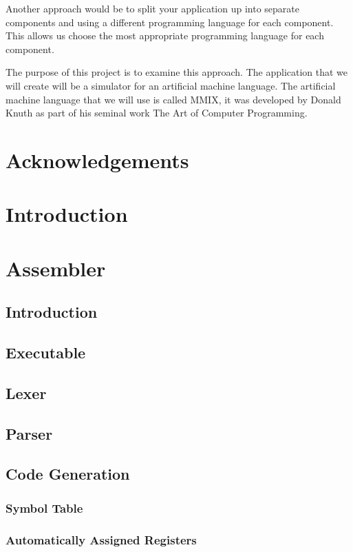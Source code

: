 \documentclass[a4paper,11pt]{report}
\begin{document}
Another approach would be to split your application up into separate components and using a different programming language for each component. This allows us choose the most appropriate programming language for each component.

The purpose of this project is to examine this approach. The application that we will create will be a simulator for an artificial machine language. The artificial machine language that we will use is called MMIX, it was developed by Donald Knuth as part of his seminal work The Art of Computer Programming\cite{knuth:aocp1}.
\newpage
{}
\tableofcontents
\newpage
\listoffigures
\newpage
\chapter*{Acknowledgements}
\chapter{Introduction}
\chapter{Assembler}
\section{Introduction}
\section{Executable}
\section{Lexer}
\section{Parser}
\section{Code Generation}
\subsection{Symbol Table}
\subsection{Automatically Assigned Registers}
\end{document}
